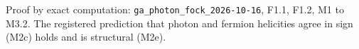 Proof by exact computation: \texttt{ga\_photon\_fock\_2026-10-16}, F1.1, F1.2, M1 to M3.2. The registered prediction that photon and fermion helicities agree in sign (M2c) holds and is structural (M2e).
